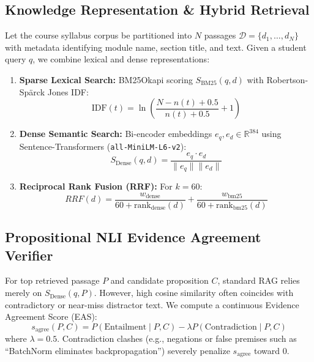 \documentclass[10pt,twocolumn,letterpaper]{article}
\begin{document}
\subsection{Knowledge Representation \& Hybrid Retrieval}
Let the course syllabus corpus be partitioned into $N$ passages $\mathcal{D} = \{d_1, \dots, d_N\}$ with metadata identifying module name, section title, and text. Given a student query $q$, we combine lexical and dense representations:
\begin{enumerate}
    \item \textbf{Sparse Lexical Search:} BM25Okapi scoring $S_{\text{BM25}}(q, d)$ with Robertson-Sp\"arck Jones IDF:
    \begin{equation}
        \text{IDF}(t) = \ln \left( \frac{N - n(t) + 0.5}{n(t) + 0.5} + 1 \right)
    \end{equation}
    \item \textbf{Dense Semantic Search:} Bi-encoder embeddings $e_q, e_d \in \mathbb{R}^{384}$ using Sentence-Transformers (\texttt{all-MiniLM-L6-v2}):
    \begin{equation}
        S_{\text{Dense}}(q, d) = \frac{e_q \cdot e_d}{\|e_q\| \|e_d\|}
    \end{equation}
    \item \textbf{Reciprocal Rank Fusion (RRF):} For $k=60$:
    \begin{equation}
        RRF(d) = \frac{w_{\text{dense}}}{60 + \text{rank}_{\text{dense}}(d)} + \frac{w_{\text{bm25}}}{60 + \text{rank}_{\text{bm25}}(d)}
    \end{equation}
\end{enumerate}

\subsection{Propositional NLI Evidence Agreement Verifier}
For top retrieved passage $P$ and candidate proposition $C$, standard RAG relies merely on $S_{\text{Dense}}(q, P)$. However, high cosine similarity often coincides with contradictory or near-miss distractor text. We compute a continuous Evidence Agreement Score (EAS):
\begin{equation}
    s_{\text{agree}}(P, C) = P(\text{Entailment} \mid P, C) - \lambda P(\text{Contradiction} \mid P, C)
\end{equation}
where $\lambda = 0.5$. Contradiction clashes (e.g., negations or false premises such as ``BatchNorm eliminates backpropagation'') severely penalize $s_{\text{agree}}$ toward 0.
\end{document}
